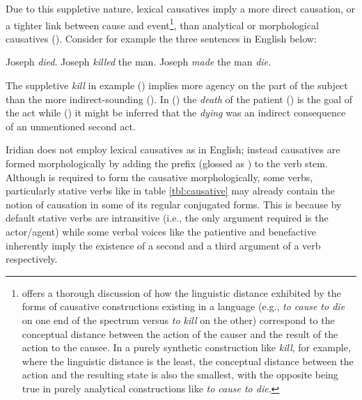 Due to this suppletive nature, lexical causatives imply a more direct causation,
or a tighter link between cause and event\footnote{\textcite{haiman1983} offers
a thorough discussion of how the linguistic distance exhibited by the forms of
causative constructions existing in a language (e.g., \emph{to cause to die} on
one end of the spectrum versus \emph{to kill} on the other) correspond to the
conceptual distance between the action of the causer and the result of the
action to the causee. In a purely synthetic construction like \emph{kill}, for
example, where the linguistic distance is the least, the conceptual distance
between the action and the resulting state is also the smallest, with the
opposite being true in purely analytical constructions like \emph{to cause to
die}.}, than analytical or morphological causatives (\cite{velupillai2012,
haiman1983}). Consider for example the three sentences in English
below:


\pex
\a Joseph \emph{died}.
\a Joseph \emph{killed} the man.
\a Joseph \emph{made} the man \emph{die.}
\xe

The suppletive \emph{kill} in example () implies more
agency on the part of the subject than the more indirect-sounding
(). In () the \emph{death} of the
patient () is the goal of the act while ()
it might be inferred that the \emph{dying} was an indirect consequence of an
unmentioned second act.


Iridian does not employ lexical causatives as in English; instead
causatives are formed morphologically by adding the prefix  (glossed as
\Caus{}) to the verb stem. Although  is required to form the causative
morphologically, some verbs, particularly stative verbs like  in table \ref{tbl:causative} may already contain the notion of
causation in some of its regular conjugated forms. This is because by default
stative verbs are intransitive (i.e., the only argument
required is the actor/agent) while some verbal voices
like the patientive and benefactive inherently imply the existence of a second and a third argument of a
verb respectively.


